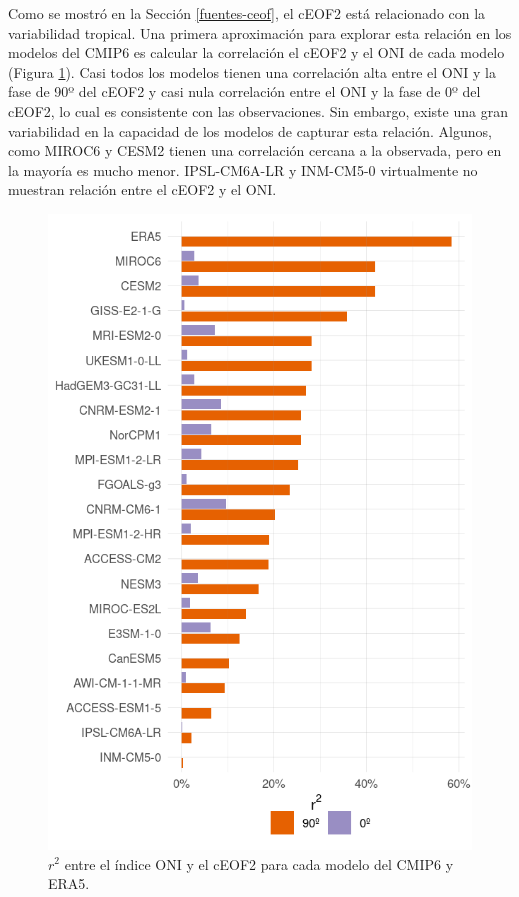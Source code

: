 \documentclass[12pt,oneside,a4paper]{reedthesis}
\begin{document}
Como se mostró en la Sección \ref{fuentes-ceof}, el cEOF2 está relacionado con la variabilidad tropical.
Una primera aproximación para explorar esta relación en los modelos del CMIP6 es calcular la correlación el cEOF2 y el ONI de cada modelo (Figura \ref{fig:cor-enso-plot}).
Casi todos los modelos tienen una correlación alta entre el ONI y la fase de 90º del cEOF2 y casi nula correlación entre el ONI y la fase de 0º del cEOF2, lo cual es consistente con las observaciones.
Sin embargo, existe una gran variabilidad en la capacidad de los modelos de capturar esta relación.
Algunos, como MIROC6 y CESM2 tienen una correlación cercana a la observada, pero en la mayoría es mucho menor.
IPSL-CM6A-LR y INM-CM5-0 virtualmente no muestran relación entre el cEOF2 y el ONI.



\begin{figure}

{\centering \includegraphics{figures/50-cmip6/cor-enso-plot-1} 

}

\caption{\(r^2\) entre el índice ONI y el cEOF2 para cada modelo del CMIP6 y ERA5.}\label{fig:cor-enso-plot}
\end{figure}
\end{document}
